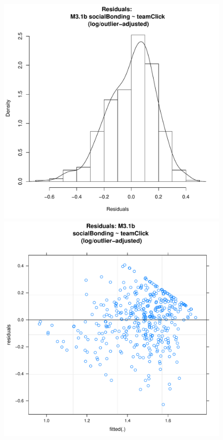 \documentclass[12pt]{report}
\begin{document}
{\begin{figure}[htbp]
  \includegraphics[scale =.4]{../images/MLM31bOutLogHist.pdf}
  \includegraphics[scale =.4]{../images/MLM31bOutLogScatter.pdf}

\end{figure}}
\end{document}
